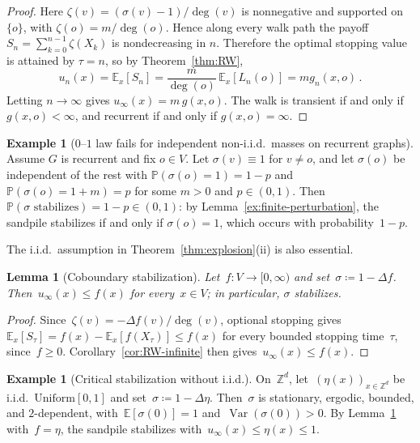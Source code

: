 \documentclass[aop]{imsart}
\theoremstyle{plain}
\newtheorem{lemma}[theorem]{Lemma}
\theoremstyle{definition}
\newtheorem{example}[theorem]{Example}
\newcommand{\Z}{\mathbb{Z}}
\newcommand{\E}{\mathbb{E}}
\renewcommand{\P}{\mathbb{P}}
\DeclareMathOperator{\var}{Var}
\begin{document}
	\begin{proof}
		Here $\zeta(v)=(\sigma(v)-1)/\deg(v)$ is nonnegative and supported on $\{o\}$, with $\zeta(o)=m/\deg(o)$.
		Hence along every walk path the payoff $S_n=\sum_{k=0}^{n-1}\zeta(X_k)$ is nondecreasing in $n$.
		Therefore the optimal stopping value is attained by $\tau=n$, so by Theorem~\ref{thm:RW},
		\[
		u_n(x)=\E_x[S_n]=\frac{m}{\deg(o)}\,\E_x[L_n(o)]=m g_n(x,o)\,.
		\]
		Letting $n\to\infty$ gives $u_\infty(x)=m\,g(x,o)$.
		The walk is transient if and only if $g(x,o)<\infty$, and recurrent if and only if $g(x,o)=\infty$.
	\end{proof}
	
	\begin{example}[$0$--$1$ law fails for independent non-i.i.d.\ masses on recurrent graphs]\label{ex:01-fails}
		Assume $G$ is recurrent and fix $o\in V$.
		Let $\sigma(v)\equiv 1$ for $v\neq o$, and let $\sigma(o)$ be independent of the rest with
		$\P(\sigma(o)=1)=1-p$ and $\P(\sigma(o)=1+m)=p$ for some $m>0$ and $p\in(0,1)$.
		Then $\P(\sigma\text{ stabilizes})=1-p\in(0,1)$: by Lemma~\ref{ex:finite-perturbation}, the sandpile stabilizes if and only if $\sigma(o)=1$, which occurs with probability~$1-p$.
	\end{example}
	
	The i.i.d.\ assumption in Theorem~\ref{thm:explosion}(ii) is also essential.
	
	\begin{lemma}[Coboundary stabilization]\label{ex:coboundary}
		Let~$f\colon V\to[0,\infty)$ and set~$\sigma\coloneqq 1-\Delta f$. Then~$u_\infty(x)\leq f(x)$ for every~$x\in V$; in particular, $\sigma$ stabilizes.
	\end{lemma}
	
	\begin{proof}
		Since~$\zeta(v)=-\Delta f(v)/\deg(v)$, optional stopping gives~$\E_x[S_\tau]=f(x)-\E_x[f(X_\tau)]\leq f(x)$ for every bounded stopping time~$\tau$, since~$f\geq 0$.  Corollary~\ref{cor:RW-infinite} then gives~$u_\infty(x)\leq f(x)$.
	\end{proof}
	
	\begin{example}[Critical stabilization without i.i.d.]\label{ex:coboundary-Zd}
		On~$\Z^d$, let~$(\eta(x))_{x\in\Z^d}$ be i.i.d.\ $\mathrm{Uniform}[0,1]$ and set~$\sigma\coloneqq 1-\Delta\eta$.
		Then~$\sigma$ is stationary, ergodic, bounded, and $2$-dependent, with~$\E[\sigma(0)]=1$ and~$\var(\sigma(0))>0$.
		By Lemma~\ref{ex:coboundary} with~$f=\eta$, the sandpile stabilizes with~$u_\infty(x)\leq\eta(x)\leq 1$.
	\end{example}
	
\end{document}

